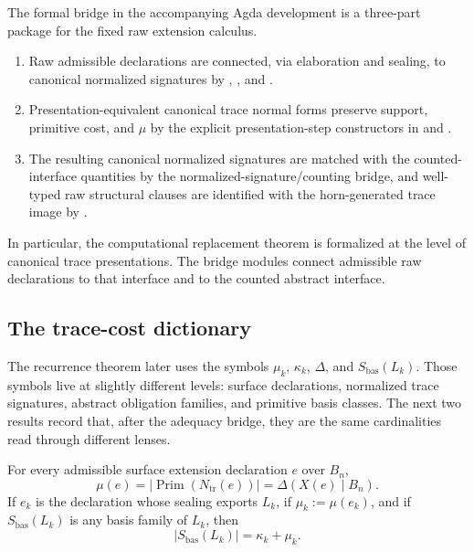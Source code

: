 \documentclass{lmcs}
\begin{document}
\begin{rem}
The formal bridge in the accompanying Agda development is a three-part package for the
fixed raw extension calculus.

\begin{enumerate}
\item Raw admissible declarations are connected, via elaboration and sealing, to canonical
normalized signatures by
,
, and
.

\item Presentation-equivalent canonical trace normal forms preserve support, primitive cost,
and \(\mu\) by the explicit presentation-step constructors in
 and
.

\item The resulting canonical normalized signatures are matched with the counted-interface
quantities by the normalized-signature/counting bridge, and well-typed raw structural clauses
are identified with the horn-generated trace image by
.
\end{enumerate}

In particular, the computational replacement theorem is formalized at the level of canonical
trace presentations.  The bridge modules connect admissible raw declarations to that
interface and to the counted abstract interface.
\end{rem}

\subsection{The trace-cost dictionary}

The recurrence theorem later uses the symbols \(\mu_k\), \(\kappa_k\), \(\Delta\), and
\(S_{\mathrm{bas}}(L_k)\).  Those symbols live at slightly different levels: surface
declarations, normalized trace signatures, abstract obligation families, and primitive basis
classes.  The next two results record that, after the adequacy bridge, they are the same
cardinalities read through different lenses.

\begin{cor}
For every admissible surface extension declaration \(e\) over \(B_n\),
\[
  \mu(e)
  = \left|\operatorname{Prim}(N_{\mathrm{tr}}(e))\right|
  = \Delta(X(e)\mid B_n).
\]
If \(e_k\) is the declaration whose sealing exports \(L_k\), if
\(\mu_k:=\mu(e_k)\), and if \(S_{\mathrm{bas}}(L_k)\) is any basis family of \(L_k\), then
\[
  |S_{\mathrm{bas}}(L_k)| = \kappa_k + \mu_k.
\]
\end{cor}
\end{document}
